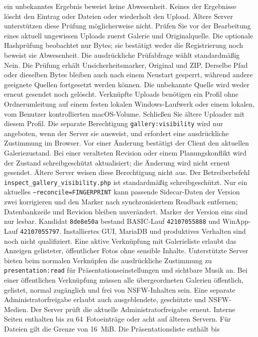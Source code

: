 \documentclass[11pt,a4paper]{article}
\begin{document}
ein unbekanntes Ergebnis beweist keine Abwesenheit. Keines der Ergebnisse
löscht den Eintrag oder Dateien oder wiederholt den Upload. Ältere Server
unterstützen diese Prüfung möglicherweise nicht.
Prüfen Sie vor der Bearbeitung eines aktuell ungewissen Uploads zuerst Galerie
und Originalquelle. Die optionale Hashprüfung beobachtet nur Bytes; sie bestätigt
weder die Registrierung noch beweist sie Abwesenheit. Die ausdrückliche
Prüfabfrage wählt standardmäßig Nein. Die Prüfung erhält Unsicherheitsmarker,
Original und ZIP. Derselbe Pfad oder dieselben Bytes bleiben auch nach einem
Neustart gesperrt, während andere geeignete Quellen fortgesetzt werden können.
Die unbekannte Quelle wird weder erneut gesendet noch gelöscht.
Verknüpfte Uploads benötigen ein Profil ohne Ordnerumleitung auf einem festen
lokalen Windows-Laufwerk oder einem lokalen, vom Benutzer kontrollierten
macOS-Volume. Schließen Sie ältere Uploader mit diesem Profil.
Die separate Berechtigung \texttt{gallery:visibility} wird nur angeboten, wenn
der Server sie ausweist, und erfordert eine ausdrückliche Zustimmung im Browser.
Vor einer Änderung bestätigt der Client den aktuellen Galeriezustand. Bei einer
veralteten Revision oder einem Planungskonflikt wird der Zustand schreibgeschützt
aktualisiert; die Änderung wird nicht erneut gesendet. Ältere Server weisen
diese Berechtigung nicht aus. Der Betreiberbefehl
\texttt{inspect\_gallery\_visibility.php} ist standardmäßig schreibgeschützt.
Nur ein aktuelles \texttt{--reconcile=FINGERPRINT} kann passende Sidecar-Daten
der Version zwei korrigieren und den Marker nach synchronisiertem Readback
entfernen; Datenbankzeile und Revision bleiben unverändert. Marker der Version
eins sind nur lesbar. Kandidat \texttt{8de8e50a} bestand BASIC-Lauf
\texttt{42107055888} und WinApp-Lauf \texttt{42107055797}. Installiertes GUI,
MariaDB und produktives Verhalten sind noch nicht qualifiziert.
Eine aktive Verknüpfung mit Galerieliste erlaubt das Anzeigen gelisteter,
öffentlicher Fotos ohne sensible Inhalte. Unterstützte Server bieten beim
normalen Verknüpfen die ausdrückliche Zustimmung zu \texttt{presentation:read}
für Präsentationseinstellungen und sichtbare Musik an. Bei einer öffentlichen
Verknüpfung müssen alle übergeordneten Galerien öffentlich, gelistet, normal
zugänglich und frei von NSFW-Inhalten sein. Eine separate Administratorfreigabe
erlaubt auch ausgeblendete, geschützte und NSFW-Medien. Der Server prüft die
aktuelle Administratorfreigabe erneut.
Interne Seiten enthalten bis zu 64~Fotoeinträge oder acht
auf älteren Servern. Für Dateien gilt die Grenze von 16~MiB. Die Präsentationsliste enthält bis
\end{document}
